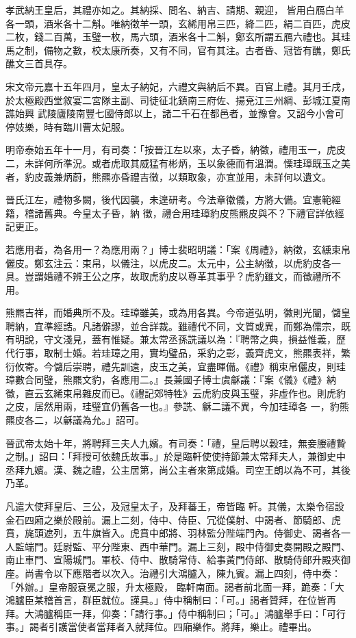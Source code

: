 \begin{pinyinscope}
 孝武納王皇后，其禮亦如之。其納採、問名、納吉、請期、親迎，
 皆用白鴈白羊各一頭，酒米各十二斛。唯納徵羊一頭，玄絺用帛三匹，絳二匹，絹二百匹，虎皮二枚，錢二百萬，玉璧一枚，馬六頭，酒米各十二斛，鄭玄所謂五鴈六禮也。其珪馬之制，備物之數，校太康所奏，又有不同，官有其注。古者昏、冠皆有醮，鄭氏醮文三首具存。



 宋文帝元嘉十五年四月，皇太子納妃，六禮文與納后不異。百官上禮。其月壬戌，於太極殿西堂敘宴二宮隊主副、司徒征北鎮南三府佐、揚兗江三州綱、彭城江夏南譙始興
 武陵廬陵南豐七國侍郎以上，諸二千石在都邑者，並豫會。又詔今小會可停妓樂，時有臨川曹太妃服。



 明帝泰始五年十一月，有司奏：「按晉江左以來，太子昏，納徵，禮用玉一，虎皮二，未詳何所準況。或者虎取其威猛有彬炳，玉以象德而有溫潤。慄珪璋既玉之美者，豹皮義兼炳蔚，熊羆亦昏禮吉徵，以類取象，亦宜並用，未詳何以遺文。



 晉氏江左，禮物多闕，後代因襲，未遑研考。今法章徽儀，方將大備。宜憲範經籍，稽諸舊典。今皇太子昏，納
 徵，禮合用珪璋豹皮熊羆皮與不？下禮官詳依經記更正。



 若應用者，為各用一？為應用兩？」博士裴昭明議：「案《周禮》，納徵，玄纁束帛儷皮。鄭玄注云：束帛，以儀注，以虎皮二。太元中，公主納徵，以虎豹皮各一具。豈謂婚禮不辨王公之序，故取虎豹皮以尊革其事乎？虎豹雖文，而徵禮所不用。



 熊羆吉祥，而婚典所不及。珪璋雖美，或為用各異。今帝道弘明，徽則光闡，儲皇聘納，宜準經誥。凡諸僻謬，並合詳裁。雖禮代不同，文質或異，而鄭為儒宗，既
 有明說，守文淺見，蓋有惟疑。兼太常丞孫詵議以為：『聘幣之典，損益惟義，歷代行事，取制士婚。若珪璋之用，實均璧品，采豹之彰，義齊虎文，熊羆表祥，繁衍攸寄。今儲后崇聘，禮先訓遠，皮玉之美，宜盡暉備。《禮》稱束帛儷皮，則珪璋數合同璧，熊羆文豹，各應用二。』長兼國子博士虞龢議：『案《儀》《禮》納徵，直云玄絺束帛雜皮而已。《禮記郊特牲》云虎豹皮與玉璧，非虛作也。則虎豹之皮，居然用兩，珪璧宜仍舊各一也。』參詵、龢二議不異，今加珪璋各
 一，豹熊羆皮各二，以龢議為允。」詔可。



 晉武帝太始十年，將聘拜三夫人九嬪。有司奏：「禮，皇后聘以穀珪，無妾媵禮贄之制。」詔曰：「拜授可依魏氏故事。」於是臨軒使使持節兼太常拜夫人，兼御史中丞拜九嬪。漢、魏之禮，公主居第，尚公主者來第成婚。司空王朗以為不可，其後乃革。



 凡遣大使拜皇后、三公，及冠皇太子，及拜蕃王，帝皆臨
 軒。其儀，太樂令宿設金石四廂之樂於殿前。漏上二刻，侍中、侍臣、冗從僕射、中謁者、節騎郎、虎賁，旄頭遮列，五牛旗皆入。虎賁中郎將、羽林監分陛端門內。侍御史、謁者各一人監端門。廷尉監、平分陛東、西中華門。漏上三刻，殿中侍御史奏開殿之殿門、南止車門、宣陽城門。軍校、侍中、散騎常侍、給事黃門侍郎、散騎侍郎升殿夾御座。尚書令以下應階者以次入。治禮引大鴻臚入，陳九賓。漏上四刻，侍中奏：「外辦。」皇帝服袞冕之服，升太極殿，
 臨軒南面。謁者前北面一拜，跪奏：「大鴻臚臣某稽首言，群臣就位。謹具。」侍中稱制曰：「可。」謁者贊拜，在位皆再拜。大鴻臚稱臣一拜，仰奏：「請行事。」侍中稱制曰；「可。」鴻臚舉手曰：「可行事。」謁者引護當使者當拜者入就拜位。四廂樂作。將拜，樂止。禮畢出。




\end{pinyinscope}
